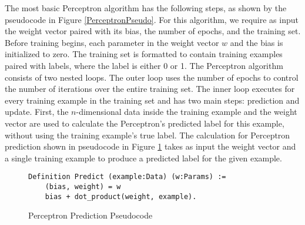 The most basic Perceptron algorithm has the following steps, as shown by the pseudocode in Figure \ref{PerceptronPseudo}. For this algorithm, we require as input the weight vector paired with its bias, the number of epochs, and the training set. Before training begins, each parameter in the weight vector $w$ and the bias is initialized to zero. The training set is formatted to contain training examples paired with labels, where the label is either 0 or 1. The Perceptron algorithm consists of two nested loops. The outer loop uses the number of epochs to control the number of iterations over the entire training set. The inner loop executes for every training example in the training set and has two main steps: prediction and update. First, the $n$-dimensional data inside the training example and the weight vector are used to calculate the Perceptron's predicted label for this example, without using the training example's true label. The calculation for Perceptron prediction shown in pseudocode in Figure \ref{PerceptronPredictPseudo} takes as input the weight vector and a single training example to produce a predicted label for the given example.

\begin{figure}
    \caption{Perceptron Prediction Pseudocode}
    \label{PerceptronPredictPseudo}
    \begin{lstlisting}
Definition Predict (example:Data) (w:Params) :=
    (bias, weight) = w 
    bias + dot_product(weight, example).
    \end{lstlisting}
\end{figure}

